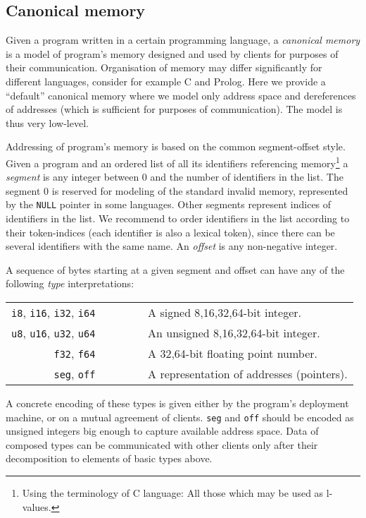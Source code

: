 \documentclass[envcountsame]{llncs}
\begin{document}
\subsection{Canonical memory}
\label{sec:CanonicalMemory}

Given a program written in a certain programming language, a \emph{canonical
memory} is a model of program's memory designed and used by clients for purposes
of their communication. Organisation of memory may differ significantly for
different languages, consider for example C and Prolog. Here we provide a
``default'' canonical memory where we model only address space and dereferences
of addresses (which is sufficient for purposes of communication). The model is
thus very low-level.

Addressing of program's memory is based on the common segment-offset style.
Given a program and an ordered list of all its identifiers referencing
memory\footnote{Using the terminology of C language: All those which may be used
as l-values.} a \emph{segment} is any integer between 0 and the number of
identifiers in the list. The segment 0 is reserved for modeling of the standard
invalid memory, represented by the \texttt{NULL} pointer in some languages.
Other segments represent indices of identifiers in the list. We recommend to
order identifiers in the list according to their token-indices (each identifier
is also a lexical token), since there can be several identifiers with the same
name. An \emph{offset} is any non-negative integer.

A sequence of bytes starting at a given segment and offset can have any of the
following \emph{type} interpretations:
\begin{center}
\begin{tabular}{rl}
\texttt{i8}, \texttt{i16}, \texttt{i32}, \texttt{i64} ~~~&~~~
A signed 8,16,32,64-bit integer.  \\
\texttt{u8}, \texttt{u16}, \texttt{u32}, \texttt{u64} ~~~&~~~
An unsigned 8,16,32,64-bit integer.  \\
\texttt{f32}, \texttt{f64} ~~~&~~~
A 32,64-bit floating point number.  \\
\texttt{seg}, \texttt{off} ~~~&~~~
A representation of addresses (pointers). \\
\end{tabular}
\end{center}
A concrete encoding of these types is given either by the program's deployment
machine, or on a mutual agreement of clients. \texttt{seg} and \texttt{off}
should be encoded as unsigned integers big enough to capture available address
space. Data of composed types can be communicated with other clients only after
their decomposition to elements of basic types above.
\end{document}
